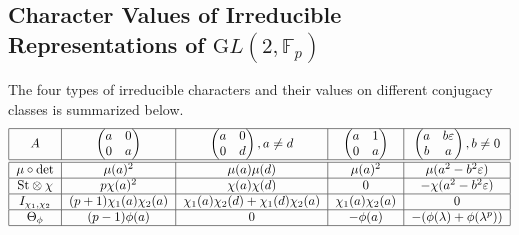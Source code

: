 \documentclass[12pt,reqno]{amsart}
\theoremstyle{plain}
\theoremstyle{definition}
\newcommand{\GL}{{\mathrm GL}}
\theoremstyle{remark}
\newcommand{\FF}{\mathbb{F}}
\begin{document}
\subsection{Character Values of Irreducible Representations of $\GL(2,\FF_p)$}
The four types of irreducible characters and their values on different conjugacy classes is summarized below.
\[
\begin{tabular}{ |c|c|c|c|c| }
 \hline
$A$ & $\begin{pmatrix}
    a & 0\\ 0&a
\end{pmatrix}$ & $\begin{pmatrix}
    a & 0\\ 0&d
\end{pmatrix}, a\neq d$ & $\begin{pmatrix}
    a &1 \\ 0&a
\end{pmatrix}$ & $\begin{pmatrix}
    a &b \varepsilon \\ b&a
\end{pmatrix}, b\neq0$\\\hline\hline
   $\mu \circ \det$ & $\mu(a)^2 $&$\mu(a)\mu(d)$ &$\mu(a)^2$ & $\mu(a^2-b^2\varepsilon)$ \\
   \hline
    $\mathrm{St}\otimes \chi$ & $p\chi(a)^2$ & $\chi(a)\chi(d)$ &$0$&$-\chi(a^2-b^2\varepsilon)$\\
    \hline
  $I_{\chi_1,\chi_2}$ & $(p+1)\chi_1(a)\chi_2(a)$ & $\chi_1(a)\chi_2(d)+\chi_1(d)\chi_2(a)$ &$\chi_1(a)\chi_2(a)$& $0$ \\
  \hline
  $\Theta_{\phi}$ & $(p-1)\phi(a)$ & $0$ &$-\phi(a)$& $-(\phi(\lambda)+\phi(\lambda^p))$\\\hline
\end{tabular}
\]
\end{document}
